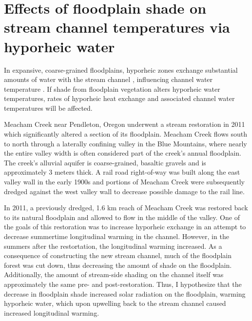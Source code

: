 \documentclass[a4paper]{article}
\begin{document}



\section{Effects of floodplain shade on stream channel temperatures via hyporheic water}

In expansive, coarse-grained floodplains, hyporheic zones exchange substantial amounts of water with the stream channel \parencite{Stanford1993AnCorridor, Faulkner2012HyporheicAttributes}, influencing channel water temperature \parencite{Arrigoni2008BufferedChannels, Evans1998}. If shade from floodplain vegetation alters hyporheic water temperatures, rates of hyporheic heat exchange and associated channel water temperatures will be affected. 

Meacham Creek near Pendleton, Oregon underwent a stream restoration in 2011 which significantly altered a section of its floodplain. Meacham Creek flows south to north through a laterally confining valley in the Blue Mountains, where nearly the entire valley width is often considered part of the creek's annual floodplain. The creek's alluvial aquifer is coarse-grained, basaltic gravels and is approximately 3 meters thick. A rail road right-of-way was built along the east valley wall in the early 1900s and portions of Meacham Creek were subsequently dredged against the west valley wall to decrease possible damage to the rail line. 

In 2011, a previously dredged, 1.6 km reach of Meacham Creek was restored back to its natural floodplain and allowed to flow in the middle of the valley. One of the goals of this restoration was to increase hyporheic exchange in an attempt to decrease summertime longitudinal warming in the channel. However, in the summers after the restortation, the longitudinal warming increased. As a consequence of constructing the new stream channel, much of the floodplain forest was cut down, thus decreasing the amount of shade on the floodplain. Additionally, the amount of stream-side shading on the channel itself was approximately the same pre- and post-restoration. Thus, I hypothesize that the decrease in floodplain shade increased solar radiation on the floodplain, warming hyporheic water, which upon upwelling back to the stream channel caused increased longitudinal warming. 
\end{document}
